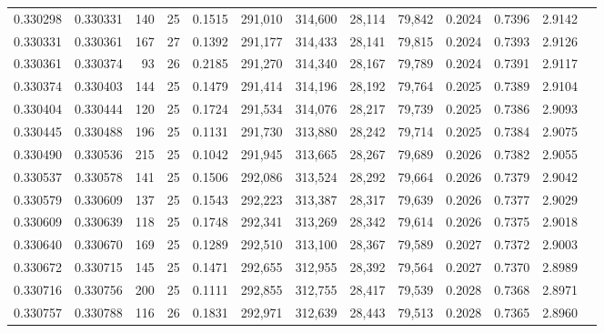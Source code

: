 \begin{tabular}{rrrrrrrrrrrrr}
0.330298 & 0.330331 &   140 &  25 &                                     0.1515 & 291,010 & 314,600 &  28,114 &  79,842 & 0.2024 & 0.7396 & 2.9142 \\
0.330331 & 0.330361 &   167 &  27 &                                     0.1392 & 291,177 & 314,433 &  28,141 &  79,815 & 0.2024 & 0.7393 & 2.9126 \\
0.330361 & 0.330374 &    93 &  26 &                                     0.2185 & 291,270 & 314,340 &  28,167 &  79,789 & 0.2024 & 0.7391 & 2.9117 \\
0.330374 & 0.330403 &   144 &  25 &                                     0.1479 & 291,414 & 314,196 &  28,192 &  79,764 & 0.2025 & 0.7389 & 2.9104 \\
0.330404 & 0.330444 &   120 &  25 &                                     0.1724 & 291,534 & 314,076 &  28,217 &  79,739 & 0.2025 & 0.7386 & 2.9093 \\
0.330445 & 0.330488 &   196 &  25 &                                     0.1131 & 291,730 & 313,880 &  28,242 &  79,714 & 0.2025 & 0.7384 & 2.9075 \\
0.330490 & 0.330536 &   215 &  25 &                                     0.1042 & 291,945 & 313,665 &  28,267 &  79,689 & 0.2026 & 0.7382 & 2.9055 \\
0.330537 & 0.330578 &   141 &  25 &                                     0.1506 & 292,086 & 313,524 &  28,292 &  79,664 & 0.2026 & 0.7379 & 2.9042 \\
0.330579 & 0.330609 &   137 &  25 &                                     0.1543 & 292,223 & 313,387 &  28,317 &  79,639 & 0.2026 & 0.7377 & 2.9029 \\
0.330609 & 0.330639 &   118 &  25 &                                     0.1748 & 292,341 & 313,269 &  28,342 &  79,614 & 0.2026 & 0.7375 & 2.9018 \\
0.330640 & 0.330670 &   169 &  25 &                                     0.1289 & 292,510 & 313,100 &  28,367 &  79,589 & 0.2027 & 0.7372 & 2.9003 \\
0.330672 & 0.330715 &   145 &  25 &                                     0.1471 & 292,655 & 312,955 &  28,392 &  79,564 & 0.2027 & 0.7370 & 2.8989 \\
0.330716 & 0.330756 &   200 &  25 &                                     0.1111 & 292,855 & 312,755 &  28,417 &  79,539 & 0.2028 & 0.7368 & 2.8971 \\
0.330757 & 0.330788 &   116 &  26 &                                     0.1831 & 292,971 & 312,639 &  28,443 &  79,513 & 0.2028 & 0.7365 & 2.8960 \\

\end{tabular}
